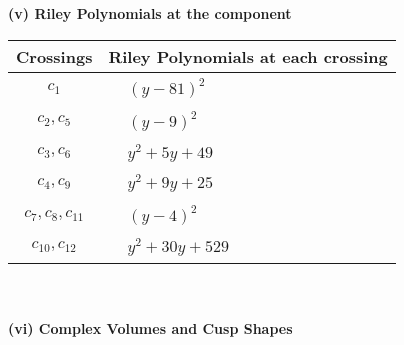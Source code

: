 \documentclass[1p]{elsarticle_modified}
\theoremstyle{definition}
\begin{document}
\flushleft \textbf{(v) Riley Polynomials at the component}\newline \\
\begin{tabular}{m{50pt}|m{274pt}}
Crossings & \hspace{64pt}Riley Polynomials at each crossing \\
\hline $$\begin{aligned}c_{1}\end{aligned}$$&$\begin{aligned}
&(y-81)^2
\end{aligned}$\\
\hline $$\begin{aligned}c_{2},c_{5}\end{aligned}$$&$\begin{aligned}
&(y-9)^2
\end{aligned}$\\
\hline $$\begin{aligned}c_{3},c_{6}\end{aligned}$$&$\begin{aligned}
&y^2+5 y+49
\end{aligned}$\\
\hline $$\begin{aligned}c_{4},c_{9}\end{aligned}$$&$\begin{aligned}
&y^2+9 y+25
\end{aligned}$\\
\hline $$\begin{aligned}c_{7},c_{8},c_{11}\end{aligned}$$&$\begin{aligned}
&(y-4)^2
\end{aligned}$\\
\hline $$\begin{aligned}c_{10},c_{12}\end{aligned}$$&$\begin{aligned}
&y^2+30 y+529
\end{aligned}$\\
\hline
\end{tabular}\\~\\
\newpage\flushleft \textbf{(vi) Complex Volumes and Cusp Shapes}
\end{document}
